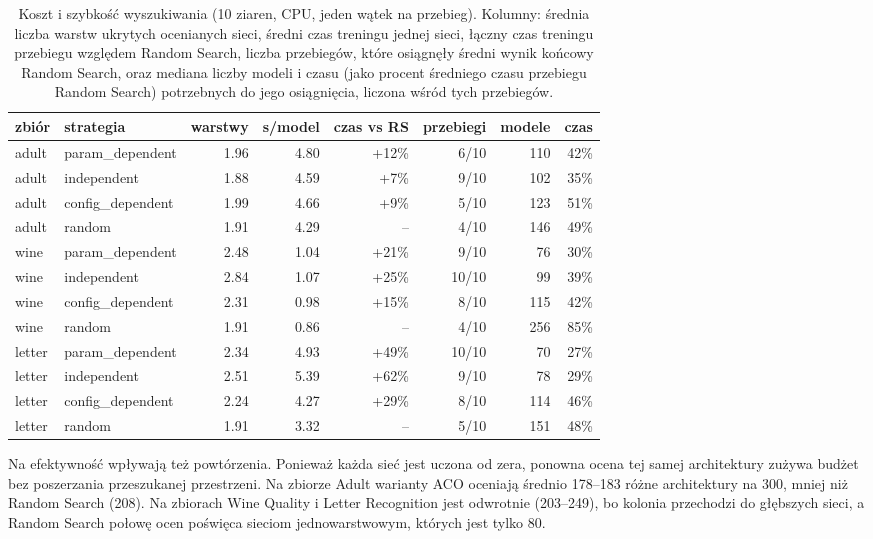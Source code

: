 \begin{table}[H]
    \centering
    \small
    \begin{tabular}{llrrrrrr}
\toprule
zbiór & strategia & warstwy & s/model & czas vs RS & przebiegi & modele & czas \\
\midrule
adult & param\_dependent & 1.96 & 4.80 & +12\% & 6/10 & 110 & 42\% \\
adult & independent & 1.88 & 4.59 & +7\% & 9/10 & 102 & 35\% \\
adult & config\_dependent & 1.99 & 4.66 & +9\% & 5/10 & 123 & 51\% \\
adult & random & 1.91 & 4.29 & -- & 4/10 & 146 & 49\% \\
\midrule
wine & param\_dependent & 2.48 & 1.04 & +21\% & 9/10 & 76 & 30\% \\
wine & independent & 2.84 & 1.07 & +25\% & 10/10 & 99 & 39\% \\
wine & config\_dependent & 2.31 & 0.98 & +15\% & 8/10 & 115 & 42\% \\
wine & random & 1.91 & 0.86 & -- & 4/10 & 256 & 85\% \\
\midrule
letter & param\_dependent & 2.34 & 4.93 & +49\% & 10/10 & 70 & 27\% \\
letter & independent & 2.51 & 5.39 & +62\% & 9/10 & 78 & 29\% \\
letter & config\_dependent & 2.24 & 4.27 & +29\% & 8/10 & 114 & 46\% \\
letter & random & 1.91 & 3.32 & -- & 5/10 & 151 & 48\% \\
\bottomrule
\end{tabular}
    \caption{Koszt i szybkość wyszukiwania (10 ziaren, CPU, jeden wątek na przebieg). Kolumny:
    średnia liczba warstw ukrytych ocenianych sieci, średni czas treningu jednej sieci,
    łączny czas treningu przebiegu względem Random Search, liczba przebiegów, które osiągnęły
    średni wynik końcowy Random Search, oraz mediana liczby modeli i czasu (jako procent
    średniego czasu przebiegu Random Search) potrzebnych do jego osiągnięcia, liczona wśród
    tych przebiegów.}
    \label{tab:e4-cost}
\end{table}

Na efektywność wpływają też powtórzenia. Ponieważ każda sieć jest uczona od zera, ponowna
ocena tej samej architektury zużywa budżet bez poszerzania przeszukanej przestrzeni. Na
zbiorze Adult warianty ACO oceniają średnio 178--183 różne architektury na 300, mniej niż
Random Search (208). Na zbiorach Wine Quality i Letter Recognition jest odwrotnie (203--249),
bo kolonia przechodzi do głębszych sieci, a Random Search połowę ocen poświęca sieciom
jednowarstwowym, których jest tylko 80.

